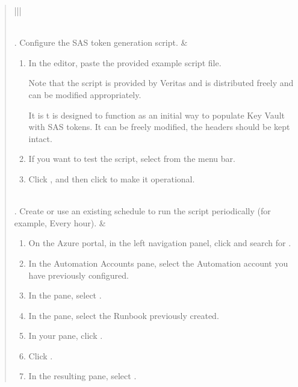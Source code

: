 \documentclass[letterpaper,10pt,english]{sphinxmanual}
\begin{document}
\begin{quote}
\begin{savenotes}
\begin{tabular}[t]{|*{2}{|}}
\begin{enumerate}
\end{enumerate}
\\
. Configure the SAS token
generation script.
&\begin{enumerate}
\item {} 
In the editor, paste the provided example script
file.

Note that the script is provided by Veritas and is
distributed freely and can be modified appropriately.

It is t is designed to function as an initial way to
populate Key Vault with SAS tokens. It can be freely
modified, the headers should be kept intact.

\item {} 
If you want to test the script, select 
from the menu bar.

\item {} 
Click , and then click  to
make it operational.

\end{enumerate}
\\
. Create or use an existing schedule
to run the script periodically
(for example, Every hour).
&\begin{enumerate}
\item {} 
On the Azure portal, in the left navigation panel,
click  and search for .

\item {} 
In the Automation Accounts pane, select the
Automation account you have previously configured.

\item {} 
In the  pane, select
.

\item {} 
In the  pane, select the Runbook
previously created.

\item {} 
In your  pane, click .

\item {} 
Click .

\item {} 
In the resulting pane, select .

\end{enumerate}
\begin{quote}
\begin{quote}


\end{quote}
\end{quote}
\end{tabular}
\end{savenotes}
\end{quote}
\end{document}
